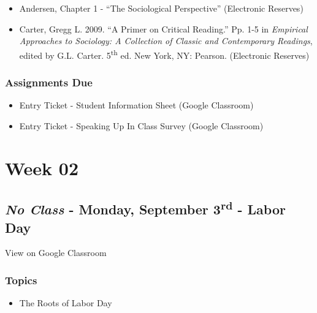 \documentclass[]{book}
\providecommand{\tightlist}{%
  \setlength{\itemsep}{0pt}\setlength{\parskip}{0pt}}
\theoremstyle{definition}
\theoremstyle{definition}
\theoremstyle{definition}
\theoremstyle{remark}
\begin{document}
\begin{itemize}
\tightlist
\item
  Andersen, Chapter 1 - ``The Sociological Perspective'' (Electronic
  Reserves)
\item
  Carter, Gregg L. 2009. ``A Primer on Critical Reading.'' Pp. 1-5 in
  \emph{Empirical Approaches to Sociology: A Collection of Classic and
  Contemporary Readings}, edited by G.L. Carter. 5\textsuperscript{th}
  ed. New York, NY: Pearson. (Electronic Reserves)
\end{itemize}

\hypertarget{assignments-due}{%
\subsubsection*{Assignments Due}\label{assignments-due}}

\begin{itemize}
\tightlist
\item
  Entry Ticket - Student Information Sheet (Google Classroom)
\item
  Entry Ticket - Speaking Up In Class Survey (Google Classroom)
\end{itemize}

\hypertarget{week-02}{%
\section*{Week 02}\label{week-02}}

\hypertarget{no-class---monday-september-3rd---labor-day}{%
\subsection*{\texorpdfstring{\emph{No Class} - Monday, September
3\textsuperscript{rd} - Labor
Day}{No Class - Monday, September 3rd - Labor Day}}\label{no-class---monday-september-3rd---labor-day}}

View on Google Classroom

\hypertarget{topics-2}{%
\subsubsection*{Topics}\label{topics-2}}

\begin{itemize}
\tightlist
\item
  The Roots of Labor Day
\end{itemize}
\end{document}
